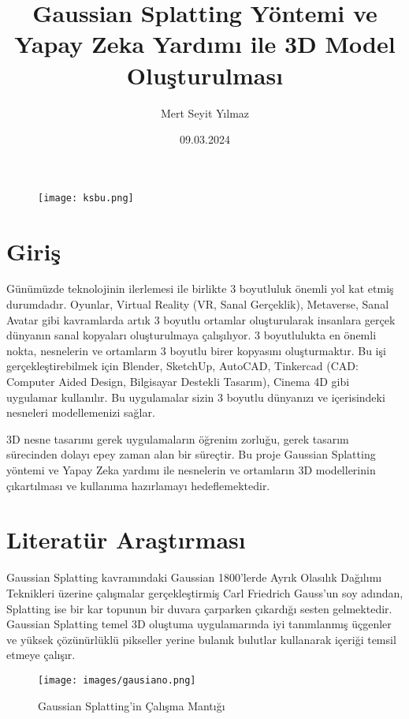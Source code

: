 \documentclass[12pt, a4paper]{article}
\title{Gaussian Splatting Yöntemi ve Yapay Zeka Yardımı ile 3D Model Oluşturulması}
\author{Mert Seyit Yılmaz}
\date{09.03.2024}
\begin{document}
	
	\begin{figure}
		\centering
		\texttt{[image: ksbu.png]}
	\end{figure}
	
	\maketitle
	
	
	\section{Giriş}
	
	Günümüzde teknolojinin ilerlemesi ile birlikte 3 boyutluluk önemli yol kat etmiş durumdadır. Oyunlar, Virtual Reality (VR, Sanal Gerçeklik), Metaverse, Sanal Avatar gibi kavramlarda artık 3 boyutlu ortamlar oluşturularak insanlara gerçek dünyanın sanal kopyaları oluşturulmaya çalışılıyor. 3 boyutlulukta en önemli nokta, nesnelerin ve ortamların 3 boyutlu birer kopyasını oluşturmaktır. Bu işi gerçekleştirebilmek için Blender, SketchUp, AutoCAD, Tinkercad (CAD: Computer Aided Design, Bilgisayar Destekli Tasarım), Cinema 4D gibi uygulamar kullanılır. Bu uygulamalar sizin 3 boyutlu dünyanızı ve içerisindeki nesneleri modellemenizi sağlar.
	
	\bigskip
	
	3D nesne tasarımı gerek uygulamaların öğrenim zorluğu, gerek tasarım sürecinden dolayı epey zaman alan bir süreçtir. Bu proje Gaussian Splatting yöntemi ve Yapay Zeka yardımı ile nesnelerin ve ortamların 3D modellerinin çıkartılması ve kullanıma hazırlamayı hedeflemektedir. 
	
	
	
	\section{Literatür Araştırması}
	
	Gaussian Splatting kavramındaki Gaussian 1800'lerde Ayrık Olasılık Dağılımı Teknikleri üzerine çalışmalar gerçekleştirmiş Carl Friedrich Gauss'un soy adından, Splatting ise bir kar topunun bir duvara çarparken çıkardığı sesten gelmektedir. Gaussian Splatting temel 3D oluştuma uygulamarında iyi tanımlanmış üçgenler ve yüksek çözünürlüklü pikseller yerine bulanık bulutlar kullanarak içeriği temsil etmeye çalışır. \cite{what-is-gaussian-splatting}
	
	\bigskip
	\begin{figure}[h]
		
		\centering
		\texttt{[image: images/gausiano.png]}
		\label{Gaussian Splatting}
		\caption{Gaussian Splatting'in Çalışma Mantığı}
	\end{figure}
	
\end{document}
